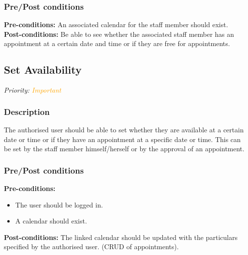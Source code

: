 	\subsubsection{Pre/Post conditions}
		\textbf{Pre-conditions:} An associated calendar for the staff member should exist.\\
		\textbf{Post-conditions:} Be able to see whether the associated staff member has an appointment at a certain date and time or if they are free for appointments. 
	
\subsection{Set Availability}
\textit{Priority: \textcolor{orange}{Important}}
	\subsubsection{Description}
	The authorised user should be able to set whether they are available at a certain date or time or if they have an appointment at a specific date or time. This can be set by the staff member himself/herself or by the approval of an appointment.\\
	\subsubsection{Pre/Post conditions}
		\textbf{Pre-conditions:} 
		\begin{itemize}
			\item The user should be logged in.
		 	\item A calendar should exist.
		\end{itemize}
		\textbf{Post-conditions:} The linked calendar should be updated with the particulars specified by the authorised user. (CRUD of appointments).